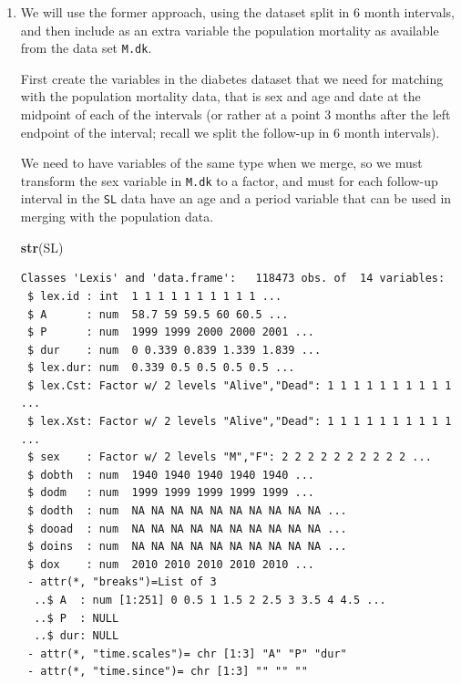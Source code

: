 \documentclass[
]{book}
\newenvironment{Shaded}{\begin{snugshade}}{\end{snugshade}}
\newcommand{\FloatTok}[1]{\textcolor[rgb]{0.00,0.00,0.81}{#1}}
\newcommand{\FunctionTok}[1]{\textcolor[rgb]{0.13,0.29,0.53}{\textbf{#1}}}
\newcommand{\NormalTok}[1]{#1}
\newcommand{\OtherTok}[1]{\textcolor[rgb]{0.56,0.35,0.01}{#1}}
\newcommand{\SpecialCharTok}[1]{\textcolor[rgb]{0.81,0.36,0.00}{\textbf{#1}}}
\begin{document}
\begin{enumerate}
\def\labelenumi{\arabic{enumi}.}
\setcounter{enumi}{11}
\item
  We will use the former approach, using the dataset split in
  6 month intervals, and then include as an extra variable the
  population mortality as available from the data set \texttt{M.dk}.

  First create the variables in the diabetes dataset that we need
  for matching with the population mortality data, that is sex and
  age and date at the midpoint of each of the intervals (or rather at a
  point 3 months after the left endpoint of the interval; recall
  we split the follow-up in 6 month intervals).

  We need to have variables of the same type when we merge, so we must
  transform the sex variable in \texttt{M.dk} to a factor, and must
  for each follow-up interval in the \texttt{SL} data have an age and
  a period variable that can be used in merging with the population data.

\begin{Shaded}
\begin{Highlighting}[]
\FunctionTok{str}\NormalTok{(SL)}
\end{Highlighting}
\end{Shaded}

\begin{verbatim}
Classes 'Lexis' and 'data.frame':   118473 obs. of  14 variables:
 $ lex.id : int  1 1 1 1 1 1 1 1 1 1 ...
 $ A      : num  58.7 59 59.5 60 60.5 ...
 $ P      : num  1999 1999 2000 2000 2001 ...
 $ dur    : num  0 0.339 0.839 1.339 1.839 ...
 $ lex.dur: num  0.339 0.5 0.5 0.5 0.5 ...
 $ lex.Cst: Factor w/ 2 levels "Alive","Dead": 1 1 1 1 1 1 1 1 1 1 ...
 $ lex.Xst: Factor w/ 2 levels "Alive","Dead": 1 1 1 1 1 1 1 1 1 1 ...
 $ sex    : Factor w/ 2 levels "M","F": 2 2 2 2 2 2 2 2 2 2 ...
 $ dobth  : num  1940 1940 1940 1940 1940 ...
 $ dodm   : num  1999 1999 1999 1999 1999 ...
 $ dodth  : num  NA NA NA NA NA NA NA NA NA NA ...
 $ dooad  : num  NA NA NA NA NA NA NA NA NA NA ...
 $ doins  : num  NA NA NA NA NA NA NA NA NA NA ...
 $ dox    : num  2010 2010 2010 2010 2010 ...
 - attr(*, "breaks")=List of 3
  ..$ A  : num [1:251] 0 0.5 1 1.5 2 2.5 3 3.5 4 4.5 ...
  ..$ P  : NULL
  ..$ dur: NULL
 - attr(*, "time.scales")= chr [1:3] "A" "P" "dur"
 - attr(*, "time.since")= chr [1:3] "" "" ""
\end{verbatim}

\begin{Shaded}
\end{Shaded}


\end{enumerate}
\end{document}

